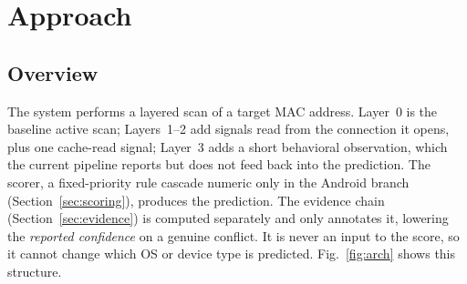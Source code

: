 \documentclass[conference]{IEEEtran}
\begin{document}
\section{Approach}\label{sec:approach}
\subsection{Overview}
The system performs a layered scan of a target MAC address. Layer~0 is the
baseline active scan; Layers~1--2 add signals read from the connection it
opens, plus one cache-read signal; Layer~3 adds a short behavioral
observation, which the current pipeline reports but does not feed back into
the prediction. The scorer, a fixed-priority rule cascade numeric only in the
Android branch (Section~\ref{sec:scoring}), produces the prediction. The
evidence chain (Section~\ref{sec:evidence}) is computed separately and only
annotates it, lowering the \emph{reported confidence} on a genuine conflict.
It is never an input to the score, so it cannot change which OS or device type
is predicted. Fig.~\ref{fig:arch} shows this structure.
\end{document}
